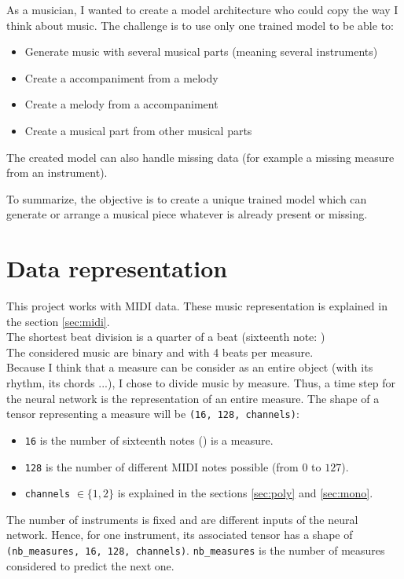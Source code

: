 \documentclass[12pt]{report}
\begin{document}
As a musician, I wanted to create a model architecture who could copy the way I think about music.
The challenge is to use only one trained model to be able to:
\begin{itemize}
    \item Generate music with several musical parts (meaning several instruments)
    \item Create a accompaniment from a melody
    \item Create a melody from a accompaniment
    \item Create a musical part from other musical parts
\end{itemize}
The created model can also handle missing data (for example a missing measure from an instrument).

To summarize, the objective is to create a unique trained model which can generate or arrange a musical piece whatever is already present or missing.

\section{Data representation}
\label{sec:data_represetation}

This project works with MIDI data. These music representation is explained in the section \ref{sec:midi}. \\
The shortest beat division is a quarter of a beat (sixteenth note: \musSixteenth) \\
The considered music are binary and with 4 beats per measure. \\
Because I think that a measure can be consider as an entire object (with its rhythm, its chords ...), I chose to divide music by measure. Thus, a time step for the neural network is the representation of an entire measure.
The shape of a tensor representing a measure will be \texttt{(16, 128, channels)}:
\begin{itemize}
    \item \texttt{16} is the number of sixteenth notes (\musSixteenth) is a measure.
    \item \texttt{128} is the number of different MIDI notes possible (from $0$ to $127$).
    \item \texttt{channels} $\in \{1, 2\}$ is explained in the sections \ref{sec:poly} and \ref{sec:mono}.
\end{itemize}

The number of instruments is fixed and are different inputs of the neural network.
Hence, for one instrument, its associated tensor has a shape of \texttt{(nb\_measures, 16, 128, channels)}. \texttt{nb\_measures} is the number of measures considered to predict the next one.
\end{document}
